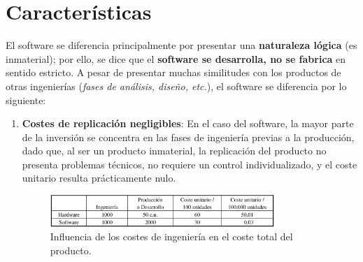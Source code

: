 \section{Características}
El software se diferencia principalmente por presentar una \textbf{naturaleza lógica} (es inmaterial); por ello, se dice que el \textbf{software se desarrolla, no se fabrica} en sentido estricto. A pesar de presentar muchas similitudes con los productos de otras ingenierías (\textit{fases de análisis, diseño, etc.}), el software se diferencia por lo siguiente:
\begin{enumerate}

    \item \textbf{Costes de replicación negligibles}:
          En el caso del software, la mayor parte de la inversión se concentra en las fases de ingeniería previas a la producción, dado que, al ser un producto inmaterial, la replicación del producto no presenta problemas técnicos, no requiere un control individualizado, y el coste unitario resulta prácticamente nulo.
          \begin{figure}[h]
            \centering
            \includegraphics[width=0.8\textwidth]{Resources/Tema1/CostesProduccion.png}
            \caption{Influencia de los costes de ingeniería en el coste total del producto.}
        \end{figure}
          

\end{enumerate}
